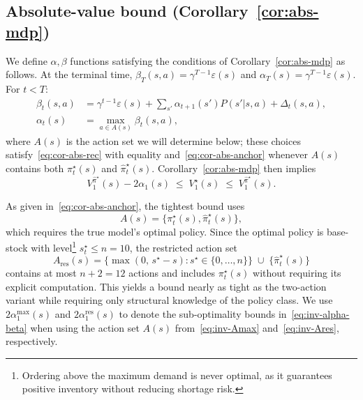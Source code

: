 \documentclass[10pt]{article}
\theoremstyle{definition}
\begin{document}
\subsection*{Absolute-value bound (Corollary~\ref{cor:abs-mdp})}

We define $\alpha, \beta$ functions satisfying the conditions of
Corollary~\ref{cor:abs-mdp} as follows. At the terminal time,
$\beta_T(s,a) = \gamma^{T-1}\varepsilon(s)$ and
$\alpha_T(s) = \gamma^{T-1}\varepsilon(s)$. For $t < T$:
\begin{equation}
\begin{aligned}
\beta_t(s,a) &= \gamma^{t-1}\varepsilon(s)
  + \sum_{s'} \alpha_{t+1}(s') P(s'|s,a) + \Delta_t(s,a),\\
\alpha_t(s) &= \max_{a \in A(s)} \beta_t(s,a),
\end{aligned}
\label{eq:inv-alpha-beta}
\end{equation}
where $A(s)$ is the action set we will determine below; these choices
satisfy~\eqref{eq:cor-abs-rec} with equality
and~\eqref{eq:cor-abs-anchor} whenever $A(s)$ contains both
$\pi^\star_t(s)$ and $\hat\pi^\star_t(s)$. Corollary~\ref{cor:abs-mdp}
then implies
\begin{equation}
V^{\hat\pi^\star}_1(s) - 2\alpha_1(s)
\;\le\; V^\star_1(s) \;\le\; V^{\hat\pi^\star}_1(s).
\label{eq:inv-sandwich}
\end{equation}

As given in~\eqref{eq:cor-abs-anchor}, the tightest bound uses
\begin{equation}
A(s) = \{\pi^\star_t(s), \hat\pi^\star_t(s)\},
\label{eq:inv-Amax}
\end{equation}
which requires the true model's optimal policy. Since the optimal
policy is base-stock with level\footnote{Ordering above the maximum
demand is never optimal, as it guarantees positive inventory without
reducing shortage risk.} $s^\star_t \le n = 10$, the restricted action
set
\begin{equation}
A_{\mathrm{res}}(s)
= \bigl\{\max(0,\, s^\star - s) : s^\star \in \{0, \dots, n\}\bigr\}
  \;\cup\; \{\hat\pi^\star_t(s)\}
\label{eq:inv-Ares}
\end{equation}
contains at most $n + 2 = 12$ actions and includes $\pi^\star_t(s)$
without requiring its explicit computation. This yields a bound nearly
as tight as the two-action variant while requiring only structural
knowledge of the policy class. We use $2\alpha^{\max}_1(s)$ and
$2\alpha^{\mathrm{res}}_1(s)$ to denote the sub-optimality bounds
in~\eqref{eq:inv-alpha-beta} when using the action set $A(s)$
from~\eqref{eq:inv-Amax} and~\eqref{eq:inv-Ares}, respectively.
\end{document}
